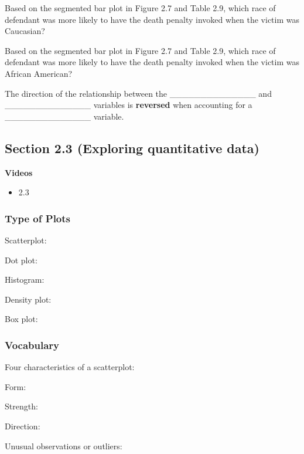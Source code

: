 \documentclass[
]{report}
\providecommand{\tightlist}{%
  \setlength{\itemsep}{0pt}\setlength{\parskip}{0pt}}
\newcommand{\rgs}{\vspace{12pt}} %
\newcommand{\rgi}{\hspace{24pt}}  %
\begin{document}
Based on the segmented bar plot in Figure 2.7 and Table 2.9, which race of defendant was more likely to have the death penalty invoked when the victim was Caucasian?
\rgs

Based on the segmented bar plot in Figure 2.7 and Table 2.9, which race of defendant was more likely to have the death penalty invoked when the victim was African American?
\rgs

The direction of the relationship between the \_\_\_\_\_\_\_\_\_\_\_\_\_\_
and \_\_\_\_\_\_\_\_\_\_\_\_\_\_ variables is \textbf{reversed} when accounting for
a \_\_\_\_\_\_\_\_\_\_\_\_\_\_ variable.
\rgs

\hypertarget{section-2.3-exploring-quantitative-data}{%
\subsection*{Section 2.3 (Exploring quantitative data)}\label{section-2.3-exploring-quantitative-data}}

\textbf{Videos}

\begin{itemize}
\tightlist
\item
  2.3
\end{itemize}

\hypertarget{type-of-plots}{%
\subsubsection*{Type of Plots}\label{type-of-plots}}

Scatterplot:
\rgs

Dot plot:
\rgs

Histogram:
\rgs

Density plot:
\rgs

Box plot:
\rgs

\hypertarget{vocabulary-4}{%
\subsubsection*{Vocabulary}\label{vocabulary-4}}

Four characteristics of a scatterplot:

\rgi Form:
\rgs

\rgi Strength:
\rgs

\rgi Direction:
\rgs

\rgi Unusual observations or outliers:
\rgs
\end{document}

